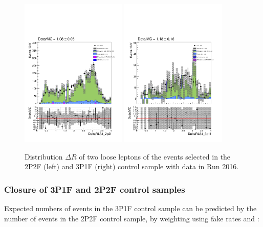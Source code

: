 \begin{figure}[!htb]
\begin{center}
    {\includegraphics [width=0.45\textwidth] {Figures/RedBkg/2P2F/DeltaRL34_2p2f.pdf}}
    {\includegraphics [width=0.45\textwidth] {Figures/RedBkg/3P1F/DeltaRL34_3p1f.pdf}} \\
    \caption{
        Distribution $\Delta R$ of two loose leptons of the events selected in the 2P2F (left) and 3P1F (right) control sample with data in Run 2016. 
    }
\label{fig:DeltaR_dataMC_16}
\end{center}
\end{figure}


\subsubsection{Closure of 3P1F and 2P2F control samples}
Expected numbers of events in the 3P1F control sample can be predicted by the number of events in the 
2P2F control sample, by weighting using fake rates \frEl and \frMu:


